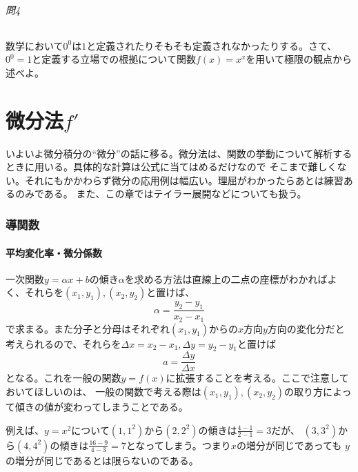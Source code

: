 \documentclass[a4j,dvipdfmx]{jsarticle}
\newcommand{\linktoMOKUZI}{\vspace{\stretch{1}}\fbox{\centerline{目次\large\pageref{目次}\normalsize ページへ}}}
\begin{document}
                \paragraph{問4}
                    数学において$0^0$は$1$と定義されたりそもそも定義されなかったりする。さて、$0^0=1$と定義する立場での根拠について関数$f(x)=x^x$を用いて極限の観点から述べよ。
                
                \linktoMOKUZI
                
    \clearpage
    \part{微分法$f'$}
    \begin{screen}
        いよいよ微分積分の``微分''の話に移る。微分法は、関数の挙動について解析するときに用いる。具体的な計算は公式に当てはめるだけなので
        そこまで難しくない。それにもかかわらず微分の応用例は幅広い。理屈がわかったらあとは練習あるのみである。
        また、この章ではテイラー展開などについても扱う。
    \end{screen}
    \clearpage
    \section{導関数}
        \subsection{平均変化率・微分係数}
            一次関数$y=\alpha x+b$の傾き$\alpha$を求める方法は直線上の二点の座標がわかればよく、それらを$(x_1,y_1),(x_2,y_2)$と置けば、
            \begin{equation}
                \alpha=\frac{y_2-y_1}{x_2-x_1}
            \end{equation}
            で求まる。また分子と分母はそれぞれ$(x_1,y_1)$からの$x$方向$y$方向の変化分だと考えられるので、それらを$\Delta x=x_2-x_1,\Delta y=y_2-y_1$と置けば
            \begin{equation}
                a= \frac{\Delta y}{\Delta x}
            \end{equation}
            となる。これを一般の関数$y=f(x)$に拡張することを考える。ここで注意しておいてほしいのは、
            一般の関数で考える際は$(x_1,y_1),(x_2,y_2)$の取り方によって傾きの値が変わってしまうことである。

            例えば、$y=x^2$について$(1,1^2)$から$(2,2^2)$の傾きは$\frac{4-1}{2-1}=3$だが、
            $(3,3^2)$から$(4,4^2)$の傾きは$\frac{16-9}{4-3}=7$となってしまう。つまり$x$の増分が同じであっても
            $y$の増分が同じであるとは限らないのである。
\end{document}
